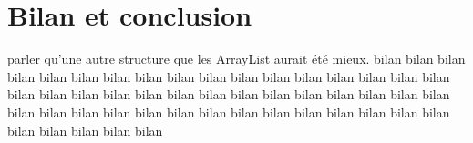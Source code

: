 \chapter{Bilan et conclusion}
parler qu'une autre structure que les ArrayList aurait été mieux.
 bilan bilan bilan bilan bilan bilan bilan bilan bilan bilan bilan bilan bilan bilan bilan bilan bilan bilan bilan bilan bilan bilan bilan bilan bilan
 bilan bilan bilan bilan bilan bilan bilan bilan bilan bilan bilan bilan bilan bilan bilan bilan bilan bilan bilan bilan bilan bilan bilan bilan bilan
